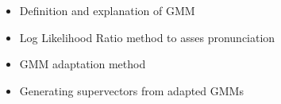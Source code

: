 \begin{itemize}
	\item Definition and explanation of GMM
	\item Log Likelihood Ratio method to asses pronunciation
	\item GMM adaptation method
	\item Generating supervectors from adapted GMMs
\end{itemize}
